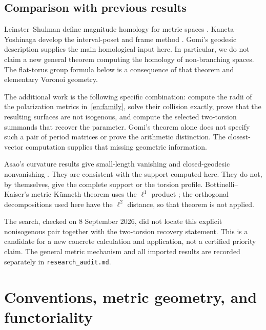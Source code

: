\documentclass[12pt]{amsart}
\theoremstyle{definition}
\theoremstyle{remark}
\numberwithin{equation}{section}
\begin{document}
\subsection{Comparison with previous results}
Leinster--Shulman define magnitude homology for metric spaces \cite[Definitions 3.3--3.4]{en:LS}. Kaneta--Yoshinaga develop the interval-poset and frame method \cite{en:KY}. Gomi's geodesic description \cite[Corollary 3.15 and Theorem 5.22]{en:G} supplies the main homological input here. In particular, we do not claim a new general theorem computing the homology of non-branching spaces. The flat-torus group formula below is a consequence of that theorem and elementary Voronoi geometry.

The additional work is the following specific combination: compute the radii of the polarization metrics in~\eqref{en:family}, solve their collision exactly, prove that the resulting surfaces are not isogenous, and compute the selected two-torsion summands that recover the parameter. Gomi's theorem alone does not specify such a pair of period matrices or prove the arithmetic distinction. The closest-vector computation supplies that missing geometric information.

Asao's curvature results give small-length vanishing and closed-geodesic nonvanishing \cite[Corollaries 4.6, 6.5 and Theorem 5.3]{en:Asao}. They are consistent with the support computed here. They do not, by themselves, give the complete support or the torsion profile. Bottinelli--Kaiser's metric K\"unneth theorem uses the $\ell^1$ product \cite[Proposition 3.1]{en:BK}; the orthogonal decompositions used here have the $\ell^2$ distance, so that theorem is not applied.

The search, checked on 8 September 2026, did not locate this explicit nonisogenous pair together with the two-torsion recovery statement. This is a candidate for a new concrete calculation and application, not a certified priority claim. The general metric mechanism and all imported results are recorded separately in \texttt{research\_audit.md}.

\section{Conventions, metric geometry, and functoriality}
\end{document}
